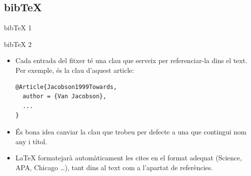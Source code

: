 \subsection{bib\TeX}
\begin{frame}[fragile]{bib\TeX{} 1}
\end{frame}

\begin{frame}[fragile]{bib\TeX{} 2}
\begin{itemize}
\item Cada entrada del fitxer  té una clau que serveix per referenciar-la dins el text.
Per exemple,  és la clau d'aquest article:
\begin{verbatim}
@Article{Jacobson1999Towards,
  author = {Van Jacobson},
  ...
}
\end{verbatim}
\item És bona idea canviar la clau que trobeu per defecte a una que contingui nom any i títol.
\item \LaTeX{} formatejarà automàticament les cites en el format adequat (Science, APA, Chicago \dots), tant dins al text com a l'apartat de referències.
\end{itemize}
\end{frame}

